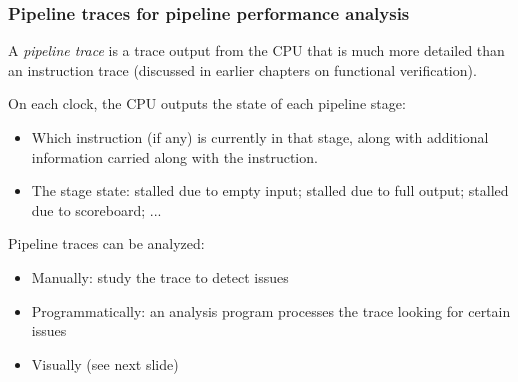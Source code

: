\begin{frame}[fragile]
\frametitle{Pipeline traces for pipeline performance analysis}

\footnotesize

A \emph{pipeline trace} is a trace output from the CPU that is much
more detailed than an instruction trace (discussed in earlier chapters
on functional verification).

On each clock, the CPU outputs the state of each pipeline stage:

\begin{itemize}

  \item Which instruction (if any) is currently in that stage, along
      with additional information carried along with the instruction.

  \item The stage state: stalled due to empty input; stalled due to
      full output; stalled due to scoreboard; ...
\end{itemize}

Pipeline traces can be analyzed:

\begin{itemize}

  \item Manually: study the trace to detect issues

  \item Programmatically: an analysis program processes the trace looking for certain issues

  \item Visually (see next slide)

\end{itemize}

\end{frame}


